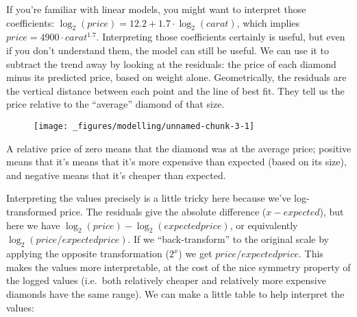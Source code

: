\begin{Shaded}
\begin{Highlighting}[]
\StringTok{ }\StringTok{ } 
\NormalTok{(}
\end{Highlighting}
\end{Shaded}

If you're familiar with linear models, you might want to interpret those
coefficients: \(\log_2(price) = 12.2 + 1.7 \cdot \log_2(carat)\), which
implies \(price = 4900 \cdot carat ^ {1.7}\). Interpreting those
coefficients certainly is useful, but even if you don't understand them,
the model can still be useful. We can use it to subtract the trend away
by looking at the residuals: the price of each diamond minus its
predicted price, based on weight alone. Geometrically, the residuals are
the vertical distance between each point and the line of best fit. They
tell us the price relative to the ``average'' diamond of that size.

\begin{Shaded}
\end{Shaded}

\begin{figure}[H]
  \centering
  \texttt{[image: \_figures/modelling/unnamed-chunk-3-1]}
\end{figure}

A relative price of zero means that the diamond was at the average
price; positive means that it's means that it's more expensive than
expected (based on its size), and negative means that it's cheaper than
expected.

Interpreting the values precisely is a little tricky here because we've
log-transformed price. The residuals give the absolute difference
(\(x - expected\)), but here we have
\(\log_2(price) - \log_2(expected price)\), or equivalently
\(\log_2(price / expected price)\). If we ``back-transform'' to the
original scale by applying the opposite transformation (\(2 ^ x\)) we
get \(price / expected price\). This makes the values more
interpretable, at the cost of the nice symmetry property of the logged
values (i.e.~both relatively cheaper and relatively more expensive
diamonds have the same range). We can make a little table to help
interpret the values:

